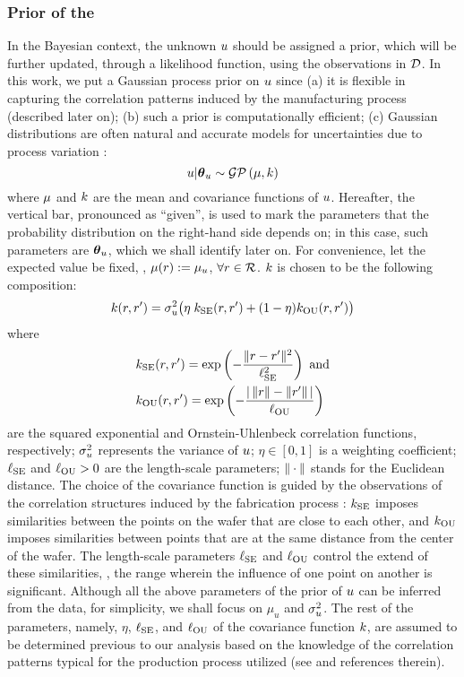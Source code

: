 \subsubsection{Prior of the \qoi}
In the Bayesian context, the unknown $u$ should be assigned a prior, which will be further updated, through a likelihood function, using the observations in $\mathcal{D}$. In this work, we put a Gaussian process prior \cite{rasmussen2006} on $u$ since (a) it is flexible in capturing the correlation patterns induced by the manufacturing process (described later on); (b) such a prior is computationally efficient; (c) Gaussian distributions are often natural and accurate models for uncertainties due to process variation \cite{srivastava2010, juan2011, juan2012}:
\[
  \u | \vparam_\u \sim \gaussianp{\fMean}{\fCov}
\]
where $\fMean$ and $\fCov$ are the mean and covariance functions of $u$. Hereafter, the vertical bar, pronounced as ``given'', is used to mark the parameters that the probability distribution on the right-hand side depends on; in this case, such parameters are ${\boldsymbol\theta}_u$, which we shall identify later on. For convenience, let the expected value be fixed, \ie, $\fMean{\r} := \mu_\u$, $\forall r \in \mathcal{R}$.
$\fCov$ is chosen to be the following composition:
\begin{equation} \elabel{covariance-function}
  \fCov{\r, \r'} = \sigma_\u^2 \big( \eta \; \fCov_\SE(\r, \r') + (1 - \eta) \fCov_\OU(\r, \r') \big)
\end{equation}
where
\begin{align*}
  & \fCov_\SE(\r, \r') = \exp\left(-\frac{\norm{\r - \r'}^2}{\ell_\SE^2}\right) \text{ and} \\
  & \fCov_\OU(\r, \r') = \exp\left(- \frac{\abs{\,\norm{\r} - \norm{\r'}\,}}{\ell_\OU} \right)
\end{align*}
are the squared exponential and Ornstein-Uhlenbeck correlation functions, respectively; $\sigma_u^2$ represents the variance of $u$; $\eta \in [0, 1]$ is a weighting coefficient; $\ell_{\text{SE}}$ and $\ell_{\text{OU}} > 0$ are the length-scale parameters; $\| \cdot \|$ stands for the Euclidean distance.
The choice of the covariance function is guided by the observations of the correlation structures induced by the fabrication process \cite{chandrakasan2001, cheng2011}: $\fCov_\SE$ imposes similarities between the points on the wafer that are close to each other, and $\fCov_\OU$ imposes similarities between points that are at the same distance from the center of the wafer.
The length-scale parameters $\ell_{\text{SE}}$ and $\ell_{\text{OU}}$ control the extend of these similarities, \ie, the range wherein the influence of one point on another is significant.
Although all the above parameters of the prior of $u$ can be inferred from the data, for simplicity, we shall focus on $\mu_u$ and $\sigma_u^2$.
The rest of the parameters, namely, $\eta$, $\ell_{\text{SE}}$, and $\ell_{\text{OU}}$ of the covariance function $\fCov$, are assumed to be determined previous to our analysis based on the knowledge of the correlation patterns typical for the production process utilized (see \cite{marzouk2009} and references therein).

